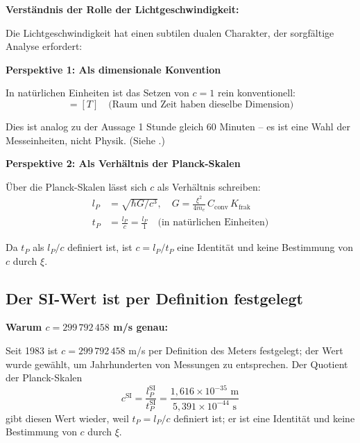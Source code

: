 	\begin{derivation}
		\textbf{Verständnis der Rolle der Lichtgeschwindigkeit:}
		
		Die Lichtgeschwindigkeit hat einen subtilen dualen Charakter, der sorgfältige Analyse erfordert:
		
		\textbf{Perspektive 1: Als dimensionale Konvention}
		
		In natürlichen Einheiten ist das Setzen von $c = 1$ rein konventionell:
		\begin{equation}
			[L] = [T] \quad \text{(Raum und Zeit haben dieselbe Dimension)}
		\end{equation}
		
		Dies ist analog zu der Aussage 1 Stunde gleich 60 Minuten -- es ist eine Wahl der Messeinheiten, nicht Physik. (Siehe \cite{Einheitenkonventionen_c_Geschwindigkeit_De}.)
		
		\textbf{Perspektive 2: Als Verhältnis der Planck-Skalen}
		
		Über die Planck-Skalen lässt sich $c$ als Verhältnis schreiben:
		\begin{align}
			l_P &= \sqrt{\hbar G/c^3}, \quad G = \frac{\xi^2}{4m_e}\,C_{\text{conv}}\,K_{\text{frak}} \\
			t_P &= \frac{l_P}{c} = \frac{l_P}{1} \quad \text{(in natürlichen Einheiten)}
		\end{align}
		
		Da $t_P$ als $l_P/c$ definiert ist, ist $c = l_P/t_P$ eine Identität und keine Bestimmung von $c$ durch $\xi$.
	\end{derivation}
	
	\subsection{Der SI-Wert ist per Definition festgelegt}
	
	\begin{keyresult}
		\textbf{Warum $c = 299\,792\,458$ m/s genau:}
		
		Seit 1983 ist $c = 299\,792\,458$ m/s per Definition des Meters festgelegt; der Wert wurde gewählt, um Jahrhunderten von Messungen zu entsprechen. Der Quotient der Planck-Skalen
		\begin{equation}
			c^{\text{SI}} = \frac{l_P^{\text{SI}}}{t_P^{\text{SI}}} = \frac{1{,}616 \times 10^{-35} \text{ m}}{5{,}391 \times 10^{-44} \text{ s}}
		\end{equation}
		gibt diesen Wert wieder, weil $t_P = l_P/c$ definiert ist; er ist eine Identität und keine Bestimmung von $c$ durch $\xi$.
	\end{keyresult}
	
